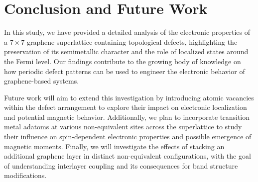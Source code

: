 \documentclass{article}
\begin{document}
\section{Conclusion and Future Work}
In this study, we have provided a detailed analysis of the electronic properties of a $7 \times 7$ graphene superlattice containing topological defects, highlighting the preservation of its semimetallic character and the role of localized states around the Fermi level. Our findings contribute to the growing body of knowledge on how periodic defect patterns can be used to engineer the electronic behavior of graphene-based systems.

Future work will aim to extend this investigation by introducing atomic vacancies within the defect arrangement to explore their impact on electronic localization and potential magnetic behavior. Additionally, we plan to incorporate transition metal adatoms at various non-equivalent sites across the superlattice to study their influence on spin-dependent electronic properties and possible emergence of magnetic moments. Finally, we will investigate the effects of stacking an additional graphene layer in distinct non-equivalent configurations, with the goal of understanding interlayer coupling and its consequences for band structure modifications.



\end{document}
